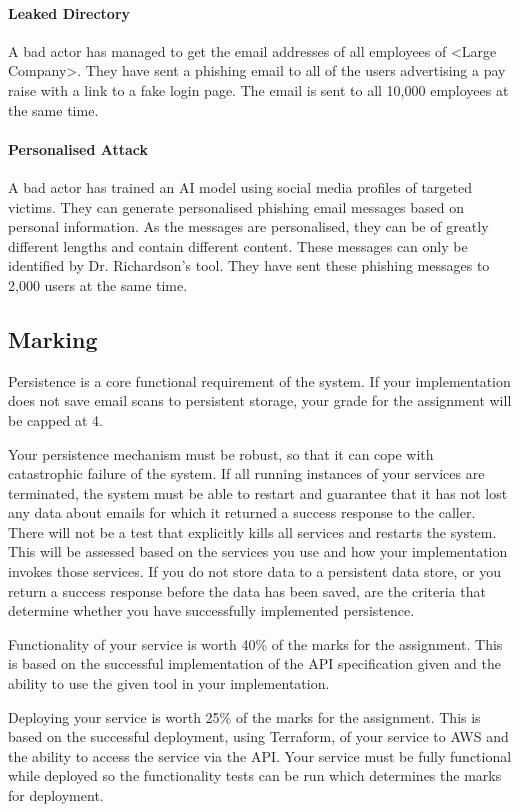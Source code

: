 \documentclass{csse4400}
\begin{document}
\paragraph{Leaked Directory}
A bad actor has managed to get the email addresses of all employees of <Large Company>. They have sent a phishing email to all of the users advertising a pay raise with a link to a fake login page. The email is sent to all 10,000 employees at the same time.

\paragraph{Personalised Attack}
A bad actor has trained an AI model using social media profiles of targeted victims.
They can generate personalised phishing email messages based on personal information.
As the messages are personalised, they can be of greatly different lengths and contain different content.
These messages can only be identified by Dr. Richardson's tool.
They have sent these phishing messages to 2,000 users at the same time.

\subsection{Marking}
Persistence is a core functional requirement of the system. If your implementation does not save email scans to persistent storage, your grade for the assignment will be capped at 4.

Your persistence mechanism must be robust, so that it can cope with catastrophic failure of the system. If all running instances of your services are terminated, the system must be able to restart and guarantee that it has not lost any data about emails for which it returned a success response to the caller. There will not be a test that explicitly kills all services and restarts the system. This will be assessed based on the services you use and how your implementation invokes those services. If you do not store data to a persistent data store, or you return a success response before the data has been saved, are the criteria that determine whether you have successfully implemented persistence.

Functionality of your service is worth 40\% of the marks for the assignment. This is based on the successful implementation of the API specification given and the ability to use the given tool in your implementation.

Deploying your service is worth 25\% of the marks for the assignment. This is based on the successful deployment, using Terraform, of your service to AWS and the ability to access the service via the API. Your service must be fully functional while deployed so the functionality tests can be run which determines the marks for deployment.
\end{document}
